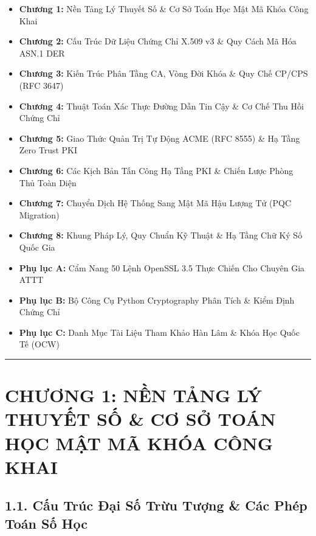 \documentclass[
]{article}
\providecommand{\tightlist}{%
  \setlength{\itemsep}{0pt}\setlength{\parskip}{0pt}}
\begin{document}
\begin{itemize}
\tightlist
\item
  \textbf{Chương 1:} Nền Tảng Lý Thuyết Số \& Cơ Sở Toán Học Mật Mã Khóa
  Công Khai
\item
  \textbf{Chương 2:} Cấu Trúc Dữ Liệu Chứng Chỉ X.509 v3 \& Quy Cách Mã
  Hóa ASN.1 DER
\item
  \textbf{Chương 3:} Kiến Trúc Phân Tầng CA, Vòng Đời Khóa \& Quy Chế
  CP/CPS (RFC 3647)
\item
  \textbf{Chương 4:} Thuật Toán Xác Thực Đường Dẫn Tin Cậy \& Cơ Chế Thu
  Hồi Chứng Chỉ
\item
  \textbf{Chương 5:} Giao Thức Quản Trị Tự Động ACME (RFC 8555) \& Hạ
  Tầng Zero Trust PKI
\item
  \textbf{Chương 6:} Các Kịch Bản Tấn Công Hạ Tầng PKI \& Chiến Lược
  Phòng Thủ Toàn Diện
\item
  \textbf{Chương 7:} Chuyển Dịch Hệ Thống Sang Mật Mã Hậu Lượng Tử (PQC
  Migration)
\item
  \textbf{Chương 8:} Khung Pháp Lý, Quy Chuẩn Kỹ Thuật \& Hạ Tầng Chữ Ký
  Số Quốc Gia
\item
  \textbf{Phụ lục A:} Cẩm Nang 50 Lệnh OpenSSL 3.5 Thực Chiến Cho Chuyên
  Gia ATTT
\item
  \textbf{Phụ lục B:} Bộ Công Cụ Python Cryptography Phân Tích \& Kiểm
  Định Chứng Chỉ
\item
  \textbf{Phụ lục C:} Danh Mục Tài Liệu Tham Khảo Hàn Lâm \& Khóa Học
  Quốc Tế (OCW)
\end{itemize}

\begin{center}\rule{0.5\linewidth}{0.5pt}\end{center}

\section{CHƯƠNG 1: NỀN TẢNG LÝ THUYẾT SỐ \& CƠ SỞ TOÁN HỌC MẬT MÃ KHÓA
CÔNG
KHAI}\label{chux1b0ux1a1ng-1-nux1ec1n-tux1ea3ng-luxfd-thuyux1ebft-sux1ed1-cux1a1-sux1edf-touxe1n-hux1ecdc-mux1eadt-muxe3-khuxf3a-cuxf4ng-khai}

\subsection{1.1. Cấu Trúc Đại Số Trừu Tượng \& Các Phép Toán Số
Học}\label{cux1ea5u-truxfac-ux111ux1ea1i-sux1ed1-trux1eebu-tux1b0ux1ee3ng-cuxe1c-phuxe9p-touxe1n-sux1ed1-hux1ecdc}
\end{document}

